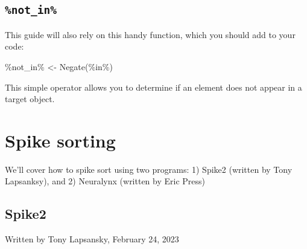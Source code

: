 \documentclass[
]{book}
\newenvironment{Shaded}{\begin{snugshade}}{\end{snugshade}}
\newcommand{\AttributeTok}[1]{\textcolor[rgb]{0.77,0.63,0.00}{#1}}
\newcommand{\FunctionTok}[1]{\textcolor[rgb]{0.00,0.00,0.00}{#1}}
\newcommand{\NormalTok}[1]{#1}
\newcommand{\OtherTok}[1]{\textcolor[rgb]{0.56,0.35,0.01}{#1}}
\newcommand{\StringTok}[1]{\textcolor[rgb]{0.31,0.60,0.02}{#1}}
\begin{document}
\hypertarget{not_in}{%
\section{\texorpdfstring{\texttt{\%not\_in\%}}{\%not\_in\%}}\label{not_in}}

This guide will also rely on this handy function, which you should add to your
code:

\begin{Shaded}
\begin{Highlighting}[]
\StringTok{\textasciigrave{}}\AttributeTok{\%not\_in\%}\StringTok{\textasciigrave{}} \OtherTok{\textless{}{-}} \FunctionTok{Negate}\NormalTok{(}\StringTok{\textasciigrave{}}\AttributeTok{\%in\%}\StringTok{\textasciigrave{}}\NormalTok{)}
\end{Highlighting}
\end{Shaded}

This simple operator allows you to determine if an element does not appear in a
target object.

\hypertarget{spike-sorting}{%
\chapter{Spike sorting}\label{spike-sorting}}

We'll cover how to spike sort using two programs: 1) Spike2 (written by Tony
Lapsanksy), and 2) Neuralynx (written by Eric Press)

\hypertarget{spike2}{%
\section{Spike2}\label{spike2}}

Written by Tony Lapsansky, February 24, 2023
\end{document}
